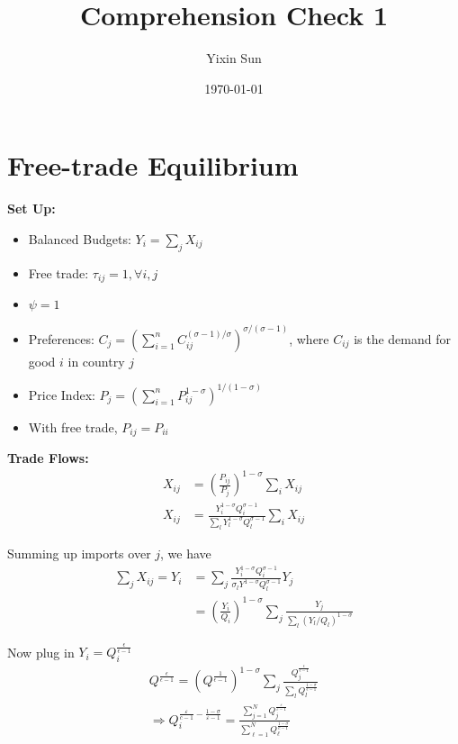 \documentclass[11pt]{article}
\title{\vspace{-1.5cm}Comprehension Check 1}
\author{Yixin Sun}
\date{\today}
\begin{document}
\maketitle

\section{Free-trade Equilibrium}

\textbf{Set Up:} 
\begin{itemize}
    \item Balanced Budgets: $Y_{i}=\sum_{j} X_{i j}$
    \item Free trade: $\tau_{ij} = 1, \forall i, j$
    \item $\psi = 1$
    \item Preferences: $C_{j}=\left(\sum_{i=1}^{n} C_{i j}^{(\sigma-1) / \sigma}\right)^{\sigma /(\sigma-1)}$, where $C_{i j}$ is the demand for good $i$ in country $j$
    \item Price Index: $P_{j}=\left(\sum_{i=1}^{n} P_{i j}^{1-\sigma}\right)^{1 /(1-\sigma)}$
    \item With free trade, $P_{ij} = P_{ii}$
\end{itemize}


\textbf{Trade Flows:}
\begin{align*}
    X_{i j} & =\left(\frac{P_{i j}}{P_{j}}\right)^{1-\sigma} \sum_{i} X_{i j} \\
    X_{i j} &=\frac{Y_i^{1-\sigma} Q_{i}^{\sigma-1}}{\sum_{l}Y_{l}^{1-\sigma} Q_{l}^{\sigma-1}} \sum_{i} X_{i j}
\end{align*}

Summing up imports over $j$, we have
\begin{align*}
    \sum_j X_{ij} = Y_i &= \sum_j\frac{Y_i^{1-\sigma}Q_i^{\sigma - 1}}{\sigma_l Y^{1-\sigma}Q_l^{\sigma-1}}Y_j \\
    &= \left(\frac{Y_i}{Q_i}\right)^{1-\sigma}\sum_j\frac{Y_j}{\sum_l (Y_l/Q_l)^{1-\sigma}}
\end{align*}

Now plug in $Y_i = Q_i^{\frac{\epsilon}{\epsilon - 1}}$
\begin{align*}
    Q^{\frac{\epsilon}{\epsilon - 1}} = \left(Q^{\frac{1}{\epsilon-1}}\right)^{1-\sigma} \sum_j \frac{Q_j^{\frac{\epsilon}{\epsilon - 1}}}{\sum_l Q_l^{\frac{1-\sigma}{\epsilon - 1}}} \\
    \Rightarrow Q_{i}^{\frac{\varepsilon}{c-1}-\frac{1-\sigma}{\varepsilon-1}}=\frac{\sum_{j=1}^{N} Q_{j}^{\frac{\varepsilon}{\varepsilon-1}}}{\sum_{\ell=1}^{N} Q_{\ell}^{\frac{1-\sigma}{e-1}}}
\end{align*}
\end{document}
